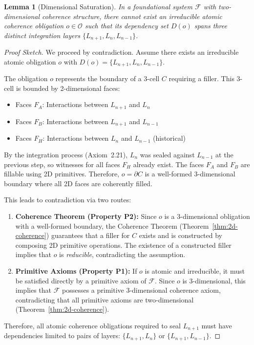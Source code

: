 \documentclass[11pt]{article}
\newtheorem{lemma}[theorem]{Lemma}
\theoremstyle{definition}
\theoremstyle{remark}
\begin{document}
\begin{lemma}[Dimensional Saturation]
\label{lem:dimensional-saturation}
In a foundational system $\mathcal{F}$ with two-dimensional coherence structure, there cannot exist an
\emph{irreducible} atomic coherence obligation $o \in \mathcal{O}$ such that its dependency set $D(o)$ spans
three distinct integration layers $\{L_{n+1}, L_n, L_{n-1}\}$.
\end{lemma}

\begin{proof}[Proof Sketch]
We proceed by contradiction. Assume there exists an irreducible atomic obligation $o$ with
$D(o) = \{L_{n+1}, L_n, L_{n-1}\}$.

The obligation $o$ represents the boundary of a 3-cell $C$ requiring a filler. This 3-cell is bounded by
2-dimensional faces:
\begin{itemize}
\item Faces $F_A$: Interactions between $L_{n+1}$ and $L_n$
\item Faces $F_B$: Interactions between $L_{n+1}$ and $L_{n-1}$
\item Faces $F_H$: Interactions between $L_n$ and $L_{n-1}$ (historical)
\end{itemize}

By the integration process (Axiom~2.21), $L_n$ was sealed against $L_{n-1}$ at the previous step, so
witnesses for all faces $F_H$ already exist. The faces $F_A$ and $F_B$ are fillable using 2D primitives.
Therefore, $o = \partial C$ is a well-formed 3-dimensional boundary where all 2D faces are coherently
filled.

This leads to contradiction via two routes:
\begin{enumerate}
\item \textbf{Coherence Theorem (Property P2):} Since $o$ is a 3-dimensional obligation with a
well-formed boundary, the Coherence Theorem (Theorem~\ref{thm:2d-coherence}) guarantees that a
filler for $C$ exists and is constructed by composing 2D primitive operations. The existence of a
constructed filler implies that $o$ is \emph{reducible}, contradicting the assumption.

\item \textbf{Primitive Axioms (Property P1):} If $o$ is atomic and irreducible, it must be satisfied
directly by a primitive axiom of $\mathcal{F}$. Since $o$ is 3-dimensional, this implies that $\mathcal{F}$ possesses
a primitive 3-dimensional coherence axiom, contradicting that all primitive axioms are
two-dimensional (Theorem~\ref{thm:2d-coherence}).
\end{enumerate}

Therefore, all atomic coherence obligations required to seal $L_{n+1}$ must have dependencies limited
to pairs of layers: $\{L_{n+1}, L_n\}$ or $\{L_{n+1}, L_{n-1}\}$.
\end{proof}
\end{document}
